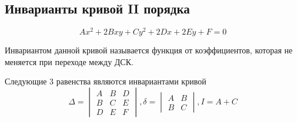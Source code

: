 \subsection{Инварианты кривой II порядка}
\[Ax^2 + 2Bxy + Cy^2 + 2Dx+2Ey+F = 0\]
\begin{definition}
	Инвариантом данной кривой называется функция от коэффициентов, которая не меняется при переходе между ДСК.
\end{definition}
\begin{theorem}
	Следующие 3 равенства являются инвариантами кривой 
	\[\Delta = \begin{vmatrix}
		A & B & D \\
		B & C & E \\
		D & E & F
	\end{vmatrix}, \delta = \begin{vmatrix}
	A & B \\ B & C
	\end{vmatrix}, I = A + C\]
\end{theorem}
